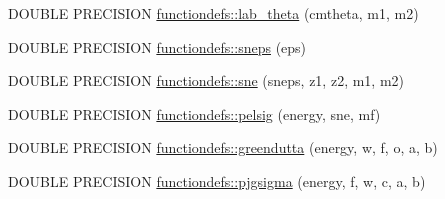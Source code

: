 \begin{DoxyCompactItemize}
DOUBLE PRECISION \hyperlink{namespacefunctiondefs_abeba54805575687a8d1db47decf4790e}{functiondefs::lab\_\-theta} (cmtheta, m1, m2)
\item 
DOUBLE PRECISION \hyperlink{namespacefunctiondefs_a80d99fe52a1cb5856694596955d8aeb9}{functiondefs::sneps} (eps)
\item 
DOUBLE PRECISION \hyperlink{namespacefunctiondefs_a78455979576075ad68feb125604462bc}{functiondefs::sne} (sneps, z1, z2, m1, m2)
\item 
DOUBLE PRECISION \hyperlink{namespacefunctiondefs_ae52b03b9e83dd8f46fd7532fb105850b}{functiondefs::pelsig} (energy, sne, mf)
\item 
DOUBLE PRECISION \hyperlink{namespacefunctiondefs_a7a31d88fad502937338eafac9a574fec}{functiondefs::greendutta} (energy, w, f, o, a, b)
\item 
DOUBLE PRECISION \hyperlink{namespacefunctiondefs_a5486e5e48a1c871c2ec9d5bc03406ea5}{functiondefs::pjgsigma} (energy, f, w, c, a, b)
\end{DoxyCompactItemize}
